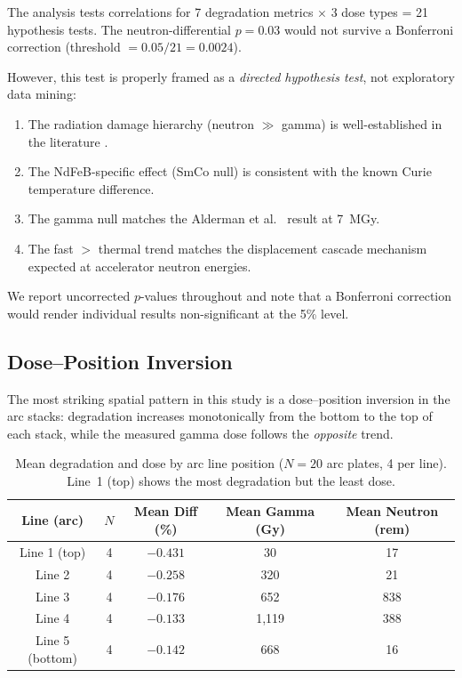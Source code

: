 \documentclass[11pt,letterpaper]{article}
\begin{document}
The analysis tests correlations for 7 degradation metrics $\times$ 3 dose
types = 21 hypothesis tests. The neutron-differential $p = 0.03$ would
not survive a Bonferroni correction (threshold $= 0.05/21 = 0.0024$).

However, this test is properly framed as a \textit{directed hypothesis test},
not exploratory data mining:
\begin{enumerate}
    \item The radiation damage hierarchy (neutron $\gg$ gamma) is
    well-established in the literature \cite{Shen2018,Simos2018,Bizen2016}.
    \item The NdFeB-specific effect (SmCo null) is consistent with the known
    Curie temperature difference.
    \item The gamma null matches the Alderman et al.~\cite{Alderman} result at \SI{7}{MGy}.
    \item The fast $>$ thermal trend matches the displacement cascade mechanism
    expected at accelerator neutron energies.
\end{enumerate}

We report uncorrected $p$-values throughout and note that a Bonferroni
correction would render individual results non-significant at the 5\% level.

\subsection{Dose--Position Inversion}
\label{sec:position_inversion}

The most striking spatial pattern in this study is a dose--position
inversion in the arc stacks: degradation increases monotonically from the
bottom to the top of each stack, while the measured gamma dose follows the
\emph{opposite} trend.

\begin{table}[H]
\centering
\caption{Mean degradation and dose by arc line position ($N = 20$ arc plates,
4 per line). Line~1 (top) shows the most degradation but the least dose.}
\label{tab:line_inversion}
\begin{tabular}{@{}ccccc@{}}
\toprule
\textbf{Line (arc)} & $N$ & \textbf{Mean Diff (\%)} &
\textbf{Mean Gamma (Gy)} & \textbf{Mean Neutron (rem)} \\
\midrule
Line 1 (top)   & 4 & $-0.431$ & 30    & 17  \\
Line 2         & 4 & $-0.258$ & 320   & 21  \\
Line 3         & 4 & $-0.176$ & 652   & 838 \\
Line 4         & 4 & $-0.133$ & 1,119 & 388 \\
Line 5 (bottom)& 4 & $-0.142$ & 668   & 16  \\
\bottomrule
\end{tabular}
\end{table}
\end{document}
